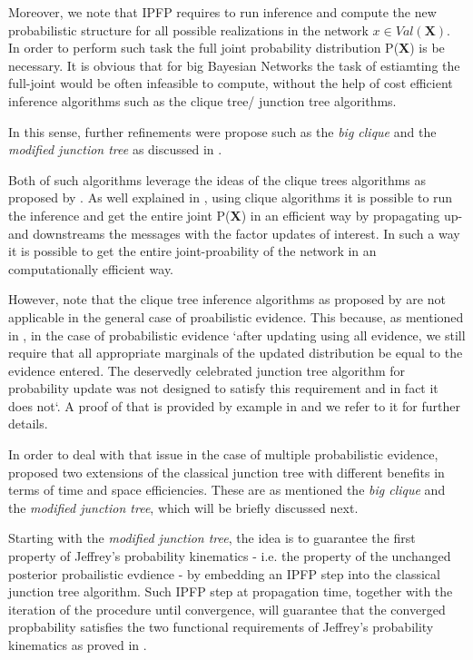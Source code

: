 \documentclass[11pt]{article}
\begin{document}
\begin{article}
Moreover, we note that IPFP requires to run inference and compute the
new probabilistic structure for all possible realizations in the
network \(x \in Val(\textbf{X})\). In order to perform such task the
full joint probability distribution P(\textbf{X}) is be necessary. It
is obvious that for big Bayesian Networks the task of estiamting the
full-joint would be often infeasible to compute, without the help of cost
efficient inference algorithms such as the clique tree/ junction tree algorithms.

In this sense, further refinements were propose such as the \emph{big
clique} and the \emph{modified junction tree} as discussed in
\cite{Valtorta_2002}.

Both of such algorithms leverage the ideas of the clique trees
algorithms as proposed by \cite{shafer1990probability}. As well
explained in \cite{koller2009probabilistic}, using clique algorithms
it is possible to run the inference and get the entire joint
P(\textbf{X}) in an efficient way by propagating up- and downstreams
the messages with the factor updates of interest. In such a way it is
possible to get the entire joint-proability of the network in an
computationally efficient way.

However, note that the clique tree inference algorithms as proposed by
\cite{shafer1990probability} are not applicable in the general case of
proabilistic evidence. This because, as mentioned in
\cite{Valtorta_2002}, in the case of probabilistic evidence `after
updating using all evidence, we still require that all appropriate
marginals of the updated distribution be equal to the evidence
entered. The deservedly celebrated junction tree algorithm for
probability update was not designed to satisfy this requirement and in
fact it does not`. A proof of that is provided by example in
\cite{Valtorta_2002} and we refer to it for further details.

In order to deal with that issue in the case of multiple probabilistic evidence,
\cite{Valtorta_2002} proposed two extensions of the classical junction
tree with different benefits in terms of time and space
efficiencies. These are as mentioned the \emph{big clique} and the
\emph{modified junction tree}, which will be briefly discussed next.

Starting with the \emph{modified junction tree}, the idea is to
guarantee the first property of Jeffrey's probability kinematics -
i.e. the property of the unchanged posterior probailistic evdience -
by embedding an IPFP step into the classical junction tree
algorithm. Such IPFP step at propagation time, together with the
iteration of the procedure until convergence, will guarantee that the
converged propbability satisfies the two functional requirements of
Jeffrey's probability kinematics as proved in
\cite{csiszar1975divergence}.


\end{article}
\end{document}
